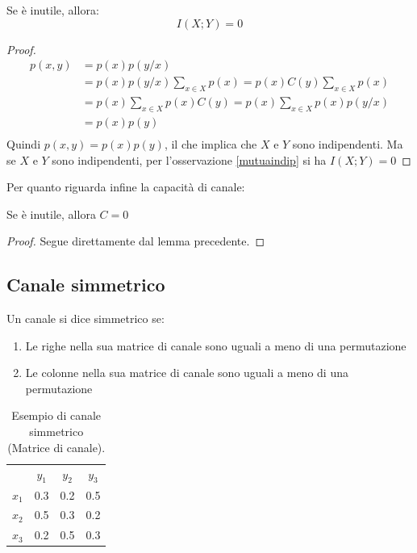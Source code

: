 \begin{lemma}
 Se  è inutile, allora:
\[
  I(X;Y)=0
\]
 \begin{proof}
\[\begin{split}
 p(x,y)&=p(x)p(y/x) \\
       &=p(x)p(y/x)\sum_{x \in X}p(x) 
       =p(x)C(y)\sum_{x \in X}p(x) \\
       &=p(x) \sum_{x \in X}p(x)C(y)
       =p(x) \sum_{x \in X}p(x)p(y/x)\\
       &=p(x) p(y) \\
  \end{split}
\]
Quindi $p(x,y)=p(x)p(y)$, il che implica che $X$ e $Y$ sono indipendenti.
Ma se $X$ e $Y$ sono indipendenti, per l'osservazione \ref{mutuaindip} si ha $I(X;Y)=0$
 \end{proof}
\end{lemma}

\noindent
Per quanto riguarda infine la capacità di canale:

\begin{lemma}
Se  è inutile, allora $C=0$
\begin{proof}
Segue direttamente dal lemma precedente.
\end{proof}
\end{lemma}

\subsection{Canale simmetrico}

\medskip

\begin{definizione}
 Un canale si dice simmetrico se:
 \begin{enumerate}
  \item Le righe nella sua matrice di canale sono uguali a meno di una permutazione
  \item Le colonne nella sua matrice di canale sono uguali a meno di una permutazione
 \end{enumerate}
\end{definizione}


\begin{table}[htbp]
  \begin{center}
   \begin{tabular}{c c c c}
	& $y_1$ & $y_2$ & $y_3$ \\
	$x_1$ & 0.3 & 0.2 & 0.5 \\ 
	$x_2$ & 0.5 & 0.3 & 0.2  \\ 
	$x_3$ & 0.2 & 0.5 & 0.3  \\ 
    \end{tabular}
  \caption{Esempio di canale simmetrico (Matrice di canale).}
  \label{tab:tsim}
  \end{center}
\end{table}


